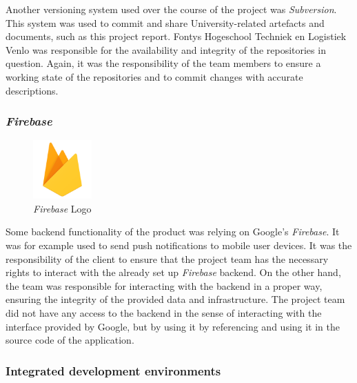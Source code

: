 Another versioning system used over the course of the project was \textit{Subversion}. This system was used to commit and share University-related artefacts and documents, such as this project report.
\newline
Fontys Hogeschool Techniek en Logistiek Venlo was responsible for the availability and integrity of the repositories in question. Again, it was the responsibility of the team members to ensure a working state of the repositories and to commit changes with accurate descriptions.

\subsubsection{\textit{Firebase}}
\label{sssec:firebase}

\begin{figure}[H]
    \begin{center}
        \includegraphics[width=0.2\textwidth]{images/logos/firebase-logo.png}
        \caption{\textit{Firebase} Logo}
        \label{fig:firebase_logo}
    \end{center}
\end{figure}

Some backend functionality of the product was relying on Google's \textit{Firebase}. It was for example used to send push notifications to mobile user devices.
\newline
It was the responsibility of the client to ensure that the project team has the necessary rights to interact with the already set up \textit{Firebase} backend. On the other hand, the team was responsible for interacting with the backend in a proper way, ensuring the integrity of the provided data and infrastructure. The project team did not have any access to the backend in the sense of interacting with the interface provided by Google, but by using it by referencing and using it in the source code of the application.

\subsubsection{Integrated development environments}
\label{sssec:ides}

